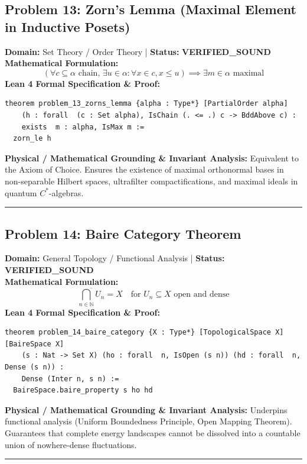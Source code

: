 \documentclass[10pt,a4paper]{article}
\begin{document}
\subsection*{Problem 13: Zorn's Lemma (Maximal Element in Inductive Posets)}
\textbf{Domain:} Set Theory / Order Theory \quad | \quad \textbf{Status:} \textcolor{green!70!black}{\textbf{VERIFIED\_SOUND}}\\
\textbf{Mathematical Formulation:}
\begin{equation*}
  \left(\forall c \subseteq \alpha \text{ chain}, \, \exists u \in \alpha: \forall x \in c, x \le u\right) \implies \exists m \in \alpha \text{ maximal}
\end{equation*}
\textbf{Lean 4 Formal Specification \& Proof:}
\begin{lstlisting}
theorem problem_13_zorns_lemma {alpha : Type*} [PartialOrder alpha] 
    (h : forall  (c : Set alpha), IsChain (. <= .) c -> BddAbove c) : 
    exists  m : alpha, IsMax m :=
  zorn_le h
\end{lstlisting}
\textbf{Physical / Mathematical Grounding \& Invariant Analysis:}
Equivalent to the Axiom of Choice. Ensures the existence of maximal orthonormal bases in non-separable Hilbert spaces, ultrafilter compactifications, and maximal ideals in quantum $C^*$-algebras.
\vspace{0.8em}\hrule\vspace{0.8em}
\subsection*{Problem 14: Baire Category Theorem}
\textbf{Domain:} General Topology / Functional Analysis \quad | \quad \textbf{Status:} \textcolor{green!70!black}{\textbf{VERIFIED\_SOUND}}\\
\textbf{Mathematical Formulation:}
\begin{equation*}
  \overline{\bigcap_{n \in \mathbb{N}} U_n} = X \quad \text{for } U_n \subseteq X \text{ open and dense}
\end{equation*}
\textbf{Lean 4 Formal Specification \& Proof:}
\begin{lstlisting}
theorem problem_14_baire_category {X : Type*} [TopologicalSpace X] [BaireSpace X] 
    (s : Nat -> Set X) (ho : forall  n, IsOpen (s n)) (hd : forall  n, Dense (s n)) : 
    Dense (Inter n, s n) :=
  BaireSpace.baire_property s ho hd
\end{lstlisting}
\textbf{Physical / Mathematical Grounding \& Invariant Analysis:}
Underpins functional analysis (Uniform Boundedness Principle, Open Mapping Theorem). Guarantees that complete energy landscapes cannot be dissolved into a countable union of nowhere-dense fluctuations.
\vspace{0.8em}\hrule\vspace{0.8em}
\end{document}
